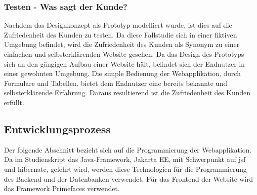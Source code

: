 \documentclass[11pt]{article}
\begin{document}
    \newpage
    \subsubsection{Testen - Was sagt der Kunde?}
    Nachdem das Designkonzept als Prototyp modelliert wurde, ist dies auf die Zufriedenheit des Kunden zu testen.
    Da diese Fallstudie sich in einer fiktiven Umgebung befindet, wird die Zufriedenheit des Kunden als Synonym zu einer einfachen und selbsterklärenden Website gesehen.
    Da das Design des Prototyps sich an den gängigen Aufbau einer Website hält, befindet sich der Endnutzer
    in einer gewohnten Umgebung. Die simple Bedienung der Webapplikation, durch Formulare und Tabellen, bietet dem 
    Endnutzer eine bereits bekannte und selbsterklärende Erfahrung. Daraus resultierend ist die Zufriedenheit des Kunden erfüllt.

    \newpage
    \subsection{Entwicklungsprozess}
    Der folgende Abschnitt bezieht sich auf die Programmierung der Webapplikation. Da im Studienskript das Java-Framework,
    Jakarta EE, mit Schwerpunkt auf \gls{jsf} und \gls{hibernate}, gelehrt wird, werden diese Technologien für die 
    Programmierung des Backend und der Datenbanken verwendet. Für das Frontend der Website wird das Framework Primefaces verwendet.
\end{document}

